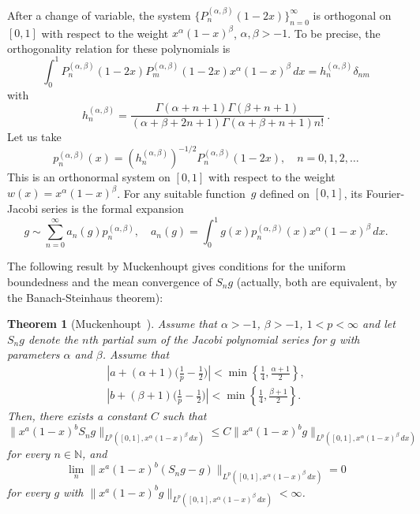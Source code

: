 \documentclass[12pt,leqno]{amsart}
\theoremstyle{plain}
\newtheorem{Thm}{Theorem}[section]
\newcommand{\lpnorm}[3]{\|{#1}\|_{L^{#2}({#3})}} %
\newcommand{\ab}{{(\alpha,\beta)}} %
\begin{document}
After a change of variable, the system $\{P_n^\ab(1-2x)\}_{n=0}^\infty$ is
orthogonal on $[0,1]$ with respect to the weight $x^\alpha(1-x)^\beta$,
$\alpha,\beta>-1$. To be precise, the orthogonality relation for these
polynomials is
\begin{equation*}
    \int_0^1 P_n^\ab(1-2x) P_m^\ab(1-2x) x^\alpha (1-x)^\beta \,dx
      = h_n^{\ab}\delta_{nm}
\end{equation*}
with 
\begin{equation*}
    h_n^{\ab} = \frac{\Gamma(\alpha+n+1) \Gamma(\beta+n+1)}
        {(\alpha+\beta+2n+1) \Gamma(\alpha+\beta+n+1) n!}\ .
\end{equation*}
Let us take
\begin{equation}
    \label{ec:newja}
    p_n^\ab(x) = (h_n^{\ab})^{-1/2}P_n^{\ab}(1-2x),\quad n=0,1,2,\ldots
\end{equation}
This is an orthonormal system on $[0,1]$ with respect to the weight $w(x)
= x^{\alpha}(1-x)^{\beta}$. For any suitable function~$g$ defined on $[0,1]$,
its Fourier-Jacobi series is the formal expansion
\begin{equation*}
    g \sim \sum_{n=0}^{\infty}a_n(g)p_n^\ab,
    \quad
    a_n(g) = \int_0^1 g(x)p_n^\ab(x)x^{\alpha}(1-x)^{\beta}\,dx.
\end{equation*}

The following result by Muckenhoupt gives conditions for the uniform
boundedness and the mean convergence of $S_n g$ (actually, both are
equivalent, by the Banach-Steinhaus theorem):

\begin{Thm}[Muckenhoupt~\cite{Muc}]
Assume that $\alpha > -1$, $\beta > -1$, $1 < p < \infty$ and let $S_n g$
denote the $n$th partial sum of the Jacobi polynomial series for $g$ with
parameters $\alpha$ and $\beta$. Assume that
\begin{gather*}
   \left| a + (\alpha+1) \Big( {\frac1p-\frac12} \Big) \right|
   < \min\left\{\frac14, \frac{\alpha+1}2\right\},
   \\
   \left| b + (\beta+1) \Big( {\frac1p-\frac12} \Big) \right|
   < \min\left\{\frac14, \frac{\beta+1}2\right\}.
\end{gather*}
Then, there exists a constant $C$ such that
\begin{equation*}
    \lpnorm{x^a (1-x)^b S_ng}p{[0,1],x^\alpha (1-x)^\beta\,dx}
    \leq C \lpnorm{x^a (1-x)^b g}p{[0,1],x^\alpha (1-x)^\beta\,dx}
\end{equation*}
for every $n \in \mathbb{N}$, and
\begin{equation*}
   \lim_n \lpnorm{x^a (1-x)^b (S_ng - g)}p{[0,1],x^\alpha (1-x)^\beta\,dx}
   = 0
\end{equation*}
for every $g$ with $\lpnorm{x^a (1-x)^b g}p{[0,1],x^\alpha (1-x)^\beta\,dx} <
\infty$.
\end{Thm}
\end{document}
